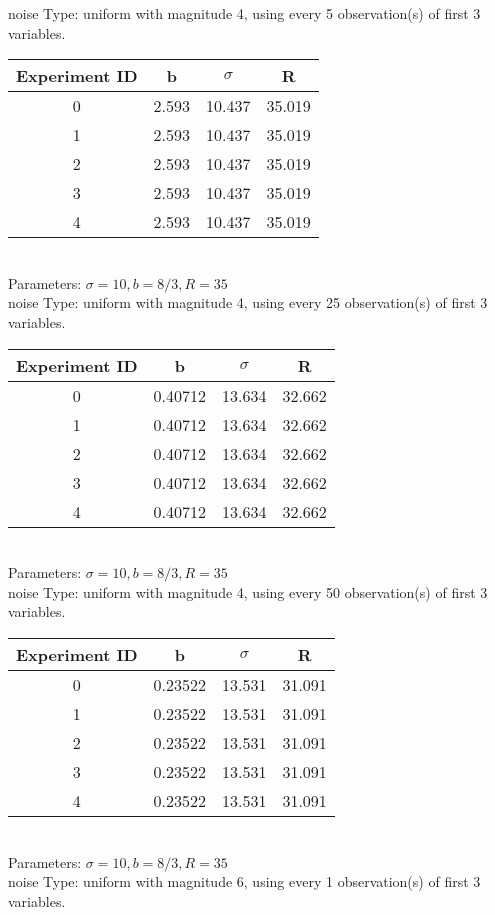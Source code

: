 \begin{multicols}{3}
noise Type: uniform with magnitude 4, using every 5 observation(s) of first 3 variables.\\
\begin{tabular}{cccc}
\hline Experiment ID & b & $\sigma$ & R \\ \hline 
0 & 2.593 & 10.437 & 35.019\\ \hline 
 1 & 2.593 & 10.437 & 35.019\\ \hline 
 2 & 2.593 & 10.437 & 35.019\\ \hline 
 3 & 2.593 & 10.437 & 35.019\\ \hline 
 4 & 2.593 & 10.437 & 35.019\\ \hline 
 \end{tabular}\\
Parameters: $\sigma=10, b=8/3, R=35$\\
noise Type: uniform with magnitude 4, using every 25 observation(s) of first 3 variables.\\
\begin{tabular}{cccc}
\hline Experiment ID & b & $\sigma$ & R \\ \hline 
0 & 0.40712 & 13.634 & 32.662\\ \hline 
 1 & 0.40712 & 13.634 & 32.662\\ \hline 
 2 & 0.40712 & 13.634 & 32.662\\ \hline 
 3 & 0.40712 & 13.634 & 32.662\\ \hline 
 4 & 0.40712 & 13.634 & 32.662\\ \hline 
 \end{tabular}\\
Parameters: $\sigma=10, b=8/3, R=35$\\
noise Type: uniform with magnitude 4, using every 50 observation(s) of first 3 variables.\\
\begin{tabular}{cccc}
\hline Experiment ID & b & $\sigma$ & R \\ \hline 
0 & 0.23522 & 13.531 & 31.091\\ \hline 
 1 & 0.23522 & 13.531 & 31.091\\ \hline 
 2 & 0.23522 & 13.531 & 31.091\\ \hline 
 3 & 0.23522 & 13.531 & 31.091\\ \hline 
 4 & 0.23522 & 13.531 & 31.091\\ \hline 
 \end{tabular}\\
Parameters: $\sigma=10, b=8/3, R=35$\\
noise Type: uniform with magnitude 6, using every 1 observation(s) of first 3 variables.\\

\end{multicols}
